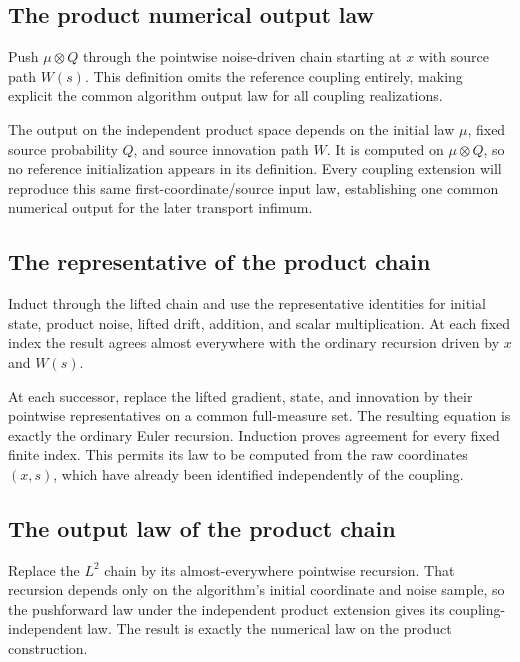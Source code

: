 \documentclass[11pt,a4paper]{article}
\begin{document}
\subsection{\texorpdfstring{The product numerical output law}{The product numerical output law}}


Push \(\mu\otimes Q\) through the pointwise noise-driven chain starting at \(x\) with source path \(W(s)\). This definition omits the reference coupling entirely, making explicit the common algorithm output law for all coupling realizations.



The output on the independent product space depends on the initial law \(\mu\), fixed source probability \(Q\), and source innovation path \(W\). It is computed on \(\mu\otimes Q\), so no reference initialization appears in its definition. Every coupling extension will reproduce this same first-coordinate/\allowbreak{}source input law, establishing one common numerical output for the later transport infimum.


\subsection{\texorpdfstring{The representative of the product chain}{The representative of the product chain}}


Induct through the lifted chain and use the representative identities for initial state, product noise, lifted drift, addition, and scalar multiplication. At each fixed index the result agrees almost everywhere with the ordinary recursion driven by \(x\) and \(W(s)\).



At each successor, replace the lifted gradient, state, and innovation by their pointwise representatives on a common full-measure set. The resulting equation is exactly the ordinary Euler recursion. Induction proves agreement for every fixed finite index. This permits its law to be computed from the raw coordinates \((x,s)\), which have already been identified independently of the coupling.


\subsection{\texorpdfstring{The output law of the product chain}{The output law of the product chain}}


Replace the \(L^2\) chain by its almost-everywhere pointwise recursion. That recursion depends only on the algorithm's initial coordinate and noise sample, so the pushforward law under the independent product extension gives its coupling-independent law. The result is exactly the numerical law on the product construction.
\end{document}
